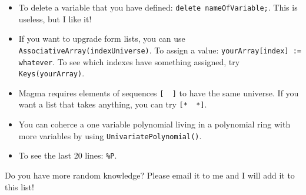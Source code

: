 \documentclass[12pt]{article}
\begin{document}
\begin{itemize}
\item To delete a variable that you have defined: \verb|delete nameOfVariable;|.  This is useless, but I like it! 

\item If you want to upgrade form lists, you can use \verb|AssociativeArray(indexUniverse)|.  To assign a value: \verb|yourArray[index] := whatever|.  To see which indexes have something assigned, try \verb|Keys(yourArray)|.

\item Magma requires elements of sequences \verb|[  ]| to have the same universe.  If you want a list that takes anything, you can try \verb|[*  *]|.

\item You can coherce a one variable polynomial living in a polynomial ring with more variables by using \verb|UnivariatePolynomial()|.
\item To see the last 20 lines: \verb|%P|.
\end{itemize}
Do you have more random knowledge? Please email it to me and I will add it to this list!
\end{document}
